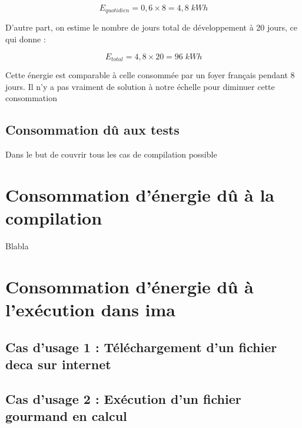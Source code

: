 \documentclass[12pt, a4paper, one side]{article}
\begin{document}
\begin{equation}
E_{quotidien}=0,6\times 8 = 4,8\; kWh
\end{equation}

D'autre part, on estime le nombre de jours total de développement à 20 jours, ce qui donne :

\begin{equation}
E_{total}=4,8\times 20 = 96\; kWh
\end{equation}


Cette énergie est comparable à celle consommée par un foyer français pendant 8 jours. Il n'y a pas vraiment de solution à notre échelle pour diminuer cette consommation 

\subsection{Consommation dû aux tests}

Dans le but de couvrir tous les cas de compilation possible

\section{Consommation d'énergie dû à la compilation}

Blabla

\section{Consommation d'énergie dû à l'exécution dans ima}

\subsection{Cas d'usage 1 : Téléchargement d'un fichier deca sur internet}

\subsection{Cas d'usage 2 : Exécution d'un fichier gourmand en calcul}
\end{document}
